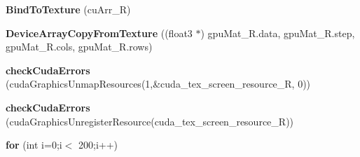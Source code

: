 \begin{DoxyCompactItemize}
\item 
{\bfseries Bind\+To\+Texture} (cu\+Arr\+\_\+R)\label{likelihood_8cpp_a5b043bab31298d8e85d86656d58972bd}

\item 
{\bfseries Device\+Array\+Copy\+From\+Texture} ((float3 $\ast$) gpu\+Mat\+\_\+\+R.\+data, gpu\+Mat\+\_\+\+R.\+step, gpu\+Mat\+\_\+\+R.\+cols, gpu\+Mat\+\_\+\+R.\+rows)\label{likelihood_8cpp_a4248503807669058cd7290381f625e1c}

\item 
{\bfseries check\+Cuda\+Errors} (cuda\+Graphics\+Unmap\+Resources(1,\&cuda\+\_\+tex\+\_\+screen\+\_\+resource\+\_\+R, 0))\label{likelihood_8cpp_a3dc8472645de6996b1ac2376def0be0b}

\item 
{\bfseries check\+Cuda\+Errors} (cuda\+Graphics\+Unregister\+Resource(cuda\+\_\+tex\+\_\+screen\+\_\+resource\+\_\+R))\label{likelihood_8cpp_a06ff6f8286c764c8cf9b4e24e2a4848c}

\item 
{\bfseries for} (int i=0;i$<$ 200;i++)\label{likelihood_8cpp_adce22cf71cc855135c2e42e849f0b726}

\end{DoxyCompactItemize}
